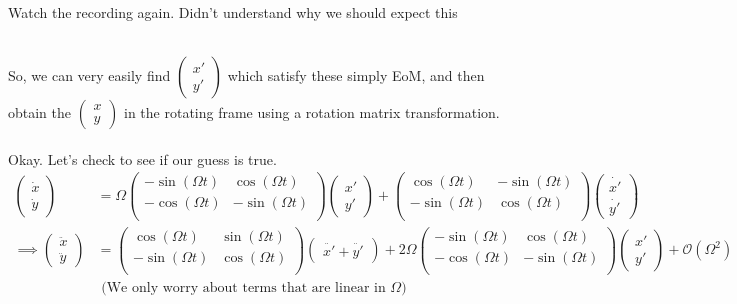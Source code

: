 \documentclass[11pt]{article}
\begin{document}
\begin{note}
  {Watch the recording again. Didn't understand why we should expect this}
\end{note}
\\
So, we can very easily find $\begin{pmatrix}
  x ' \\ y'
\end{pmatrix}$ which satisfy these simply EoM, and then obtain the $\begin{pmatrix}
  x \\ y
\end{pmatrix}$ in the rotating frame using a rotation matrix transformation.
\\
\\
Okay. Let's check to see if our guess is true.
\begin{align*}
  \begin{pmatrix}
    \dot{x} \\ \dot{y}
  \end{pmatrix} &= \Omega \begin{pmatrix}
    -\sin(\Omega t) & \cos(\Omega t) \\
    -\cos(\Omega t) & -\sin(\Omega t) \\
  \end{pmatrix} \begin{pmatrix}
    x' \\ y'
  \end{pmatrix} + \begin{pmatrix}
    \cos(\Omega t) & -\sin(\Omega t) \\
    -\sin(\Omega t) & \cos(\Omega t) \\
  \end{pmatrix} \begin{pmatrix}
    \dot{x'} \\ \dot{y'}
  \end{pmatrix} \\
  \implies \begin{pmatrix}
    \ddot{x} \\ \ddot{y}
  \end{pmatrix} &= \begin{pmatrix}
    \cos(\Omega t) & \sin(\Omega t) \\
    -\sin(\Omega t) & \cos(\Omega t) \\
  \end{pmatrix} \begin{pmatrix}
    \ddot{x'} + \ddot{y'}
  \end{pmatrix} + 2 \Omega \begin{pmatrix}
    -\sin(\Omega t) & \cos(\Omega t) \\
    -\cos(\Omega t) & -\sin(\Omega t) \\
  \end{pmatrix} \begin{pmatrix}
    x' \\ y'
  \end{pmatrix} + \mathcal{O}(\Omega^2) \\
  &\text{ (We only worry about terms that are linear in $\Omega$)}
\end{align*} 
\end{document}
